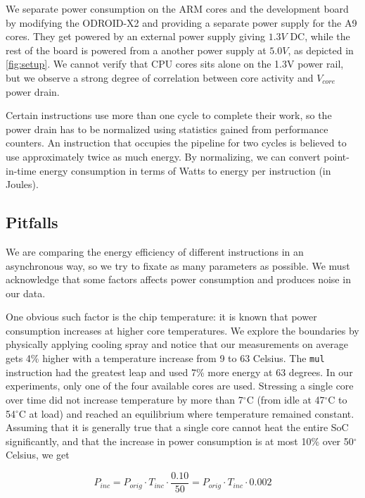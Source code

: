 We separate power consumption on the ARM cores and the development board by
modifying the ODROID-X2 and providing a separate power supply for the A9 cores.
They get powered by an external power supply giving $1.3V$ DC, while the rest of
the board is powered from a another power supply at $5.0V$, as depicted in
\autoref{fig:setup}. We cannot verify that CPU cores sits alone on the 1.3V
power rail, but we observe a strong degree of correlation between core activity
and $V_{core}$ power drain.

Certain instructions use more than one cycle to complete their work, so the
power drain has to be normalized using statistics gained from performance
counters. An instruction that occupies the pipeline for two cycles is believed
to use approximately twice as much energy. By normalizing, we can convert
point-in-time energy consumption in terms of Watts to energy per instruction (in
Joules).


\subsection{Pitfalls}
We are comparing the energy efficiency of different instructions in an
asynchronous way, so we try to fixate as many parameters as possible. We must
acknowledge that some factors affects power consumption and produces noise in
our data.

\label{sec:temperature}
One obvious such factor is the chip temperature: it is known that power
consumption increases at higher core temperatures. We explore the boundaries by
physically applying cooling spray and notice that our measurements on average
gets 4\% higher with a temperature increase from 9 to 63 Celsius. The
\texttt{mul} instruction had the greatest leap and used 7\% more energy at 63
degrees. In our experiments, only one of the four available cores are used.
Stressing a single core over time did not increase temperature by more than
7$^\circ$C (from idle at 47$^\circ$C to 54$^\circ$C at load) and reached an
equilibrium where temperature remained constant. Assuming that it is generally
true that a single core cannot heat the entire SoC significantly, and that the
increase in power consumption is at most 10\% over 50$^\circ$ Celsius, we get

\begin{equation}
    P_{inc} = P_{orig} \cdot T_{inc} \cdot \frac{0.10}{50} = P_{orig} \cdot T_{inc} \cdot 0.002
\end{equation}

